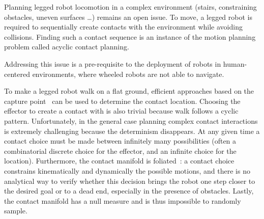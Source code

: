 
Planning legged robot locomotion in a complex environment (stairs, constraining obstacles, uneven surfaces \dots) remains an open issue.
To move, a legged robot is required to sequentially create contacts with the environment while avoiding collisions. Finding such a contact sequence is an instance of the motion planning problem called acyclic contact planning.

Addressing this issue is a pre-requisite to the deployment of robots in human-centered environments, where wheeled robots are not able to navigate. 

To make a legged robot walk on a flat ground, efficient approaches based on the capture point~\citep{Pratt2006} can be used to determine the contact location. Choosing the effector
to create a contact with is also trivial because walk follows a cyclic pattern.
Unfortunately, in the general case planning complex contact interactions is extremely challenging because the determinism disappears.
At any given time a contact choice must be made between infinitely many possibilities (often a combinatorial discrete choice for the effector, and an infinite choice for the location). Furthermore, the contact manifold is foliated~\citep{simeon-manipulation-04}: a contact choice constrains kinematically and dynamically the possible motions, and there is no analytical way to verify whether this decision brings the robot one step closer to the desired goal or to a dead end, especially in the presence of obstacles. Lastly, the contact manifold has a null measure and is thus impossible to randomly sample.






